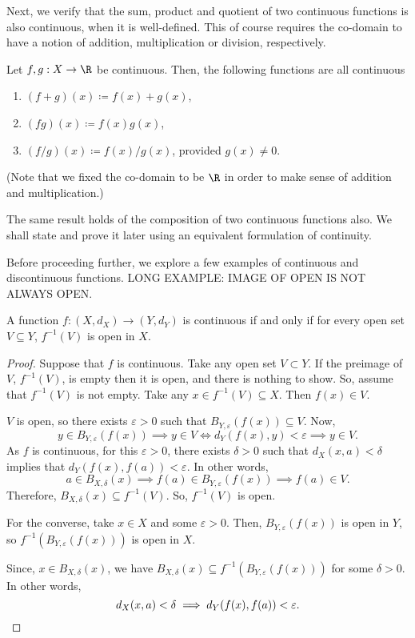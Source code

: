 \documentclass[draft]{penrose}
\newcommand{\oB}{B}
\begin{document}
Next, we verify that the sum, product and quotient of two continuous functions is also continuous, when it is well-defined. This of course requires the co-domain to have a notion of addition, multiplication or division, respectively.
\begin{nlemma}
  Let $f,g:X \to \R$ be continuous. Then, the following functions are all continuous
  \begin{enumerate}
  \item $(f+g)(x) \coloneq f(x) + g(x)$,
  \item $(fg)(x) \coloneq f(x)g(x)$,
  \item $(f/g)(x) \coloneq f(x)/g(x)$, provided $g(x) \neq 0$.
  \end{enumerate}
\end{nlemma}
(Note that we fixed the co-domain to be $\R$ in order to make sense of addition and multiplication.)

The same result holds of the composition of two continuous functions also. We shall state and prove it later using an equivalent formulation of continuity.

Before proceeding further, we explore a few examples of continuous and discontinuous functions. LONG EXAMPLE: IMAGE OF OPEN IS NOT ALWAYS OPEN.

\begin{nthm}
  A function $f:(X, d_X) \to (Y, d_Y)$ is continuous if and only if for every open set $V \subseteq Y$, $f^{-1}(V)$ is open in $X$.
\end{nthm}
\begin{proof}
  Suppose that $f$ is continuous. Take any open set $V \subset Y$. If the preimage of $V$, $f^{-1}(V)$, is empty then it is open, and there is nothing to show. So, assume that $f^{-1}(V)$ is not empty. Take any $x \in f^{-1}(V) \subseteq X$. Then $f(x) \in V$.

  $V$ is open, so there exists $\varepsilon > 0$ such that $\oB_{Y,\varepsilon}(f(x)) \subseteq V$. Now,
  \begin{equation*}
    y \in \oB_{Y,\varepsilon}(f(x)) \implies y \in V
    \iff d_{Y}(f(x),y) < \varepsilon \implies y \in V.
  \end{equation*}
  As $f$ is continuous, for this $\varepsilon>0$, there exists $\delta>0$ such that $d_{X}(x,a) < \delta$ implies that $d_{Y}(f(x),f(a))<\varepsilon$. In other words,
  \begin{equation*}
    a \in \oB_{X,\delta}(x) \implies f(a) \in\oB_{Y,\varepsilon}(f(x)) \implies f(a) \in V.
  \end{equation*}
  Therefore, $\oB_{X,\delta}(x) \subseteq f^{-1}(V)$. So, $f^{-1}(V)$ is open.

  For the converse, take $x \in X$ and some $\varepsilon>0$. Then, $B_{Y, \varepsilon}(f(x))$ is open in $Y$, so $f^{-1}(B_{Y, \varepsilon}(f(x)))$ is open in $X$.

  Since, $x \in B_{X,\delta}(x)$, we have $B_{X,\delta}(x) \subseteq f^{-1}(B_{Y, \varepsilon}(f(x)))$ for some $\delta>0$. In other words,
  \begin{equation*}
    d_{X}(x,a) < \delta \implies d_{Y}(f(x), f(a)) < \varepsilon.\qedhere
  \end{equation*}
\end{proof}
\end{document}
